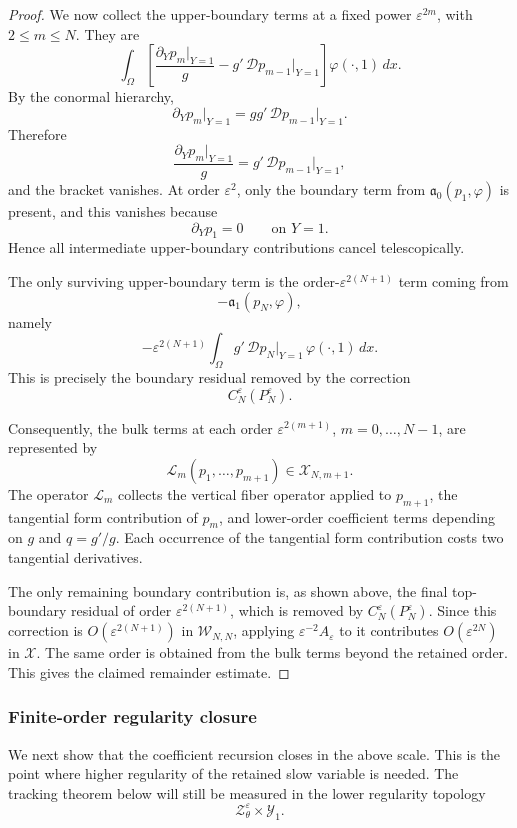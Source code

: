 \documentclass[11pt]{article}
\theoremstyle{definition}
\theoremstyle{remark}
\numberwithin{equation}{section}
\begin{document}
\begin{proof}
We now collect the upper-boundary terms at a fixed power
\(\varepsilon^{2m}\), with \(2\le m\le N\). They are
\[
\int_\Omega
\left[
\frac{\partial_Yp_m|_{Y=1}}{g}
-
g'\,\mathcal Dp_{m-1}\big|_{Y=1}
\right]
\varphi(\cdot,1)\,dx.
\]
By the conormal hierarchy,
\[
\partial_Yp_m\big|_{Y=1}
=
gg'\,\mathcal Dp_{m-1}\big|_{Y=1}.
\]
Therefore
\[
\frac{\partial_Yp_m|_{Y=1}}{g}
=
g'\,\mathcal Dp_{m-1}\big|_{Y=1},
\]
and the bracket vanishes. At order \(\varepsilon^2\), only the boundary term from
\(\mathfrak a_0(p_1,\varphi)\) is present, and this vanishes because
\[
\partial_Yp_1=0
\qquad\text{on }Y=1.
\]
Hence all intermediate upper-boundary contributions cancel telescopically.

The only surviving upper-boundary term is the order-\(\varepsilon^{2(N+1)}\) term coming
from
\[
-\mathfrak a_1(p_N,\varphi),
\]
namely
\[
-\varepsilon^{2(N+1)}
\int_\Omega
g'\,\mathcal Dp_N\big|_{Y=1}\,
\varphi(\cdot,1)\,dx.
\]
This is precisely the boundary residual removed by the correction
\[
C_N^\varepsilon(P_N^\varepsilon).
\]

Consequently, the bulk terms at each order \(\varepsilon^{2(m+1)}\),
\(m=0,\dots,N-1\), are represented by
\[
\mathcal L_m(p_1,\dots,p_{m+1})\in\mathcal X_{N,m+1}.
\]
The operator \(\mathcal L_m\) collects the vertical fiber operator applied to
\(p_{m+1}\), the tangential form contribution of \(p_m\), and lower-order
coefficient terms depending on \(g\) and \(q=g'/g\). Each occurrence of the
tangential form contribution costs two tangential derivatives.

The only remaining boundary contribution is, as shown above, the final top-boundary residual of
order \(\varepsilon^{2(N+1)}\), which is removed by \(C_N^\varepsilon(P_N^\varepsilon)\). 
Since this correction is \(O(\varepsilon^{2(N+1)})\) in \(\mathcal W_{N,N}\), applying
\(\varepsilon^{-2}A_\varepsilon\)
to it contributes \(O(\varepsilon^{2N})\) in \(\mathcal X\). The same order is obtained
from the bulk terms beyond the retained order. This gives the claimed
remainder estimate.
\end{proof}

\subsubsection*{Finite-order regularity closure}

We next show that the coefficient recursion closes in the above scale. This is
the point where higher regularity of the retained slow variable is needed. The
tracking theorem below will still be measured in the lower regularity topology
\[
\mathcal Z_\theta^\varepsilon\times\mathcal Y_1.
\]
\end{document}
